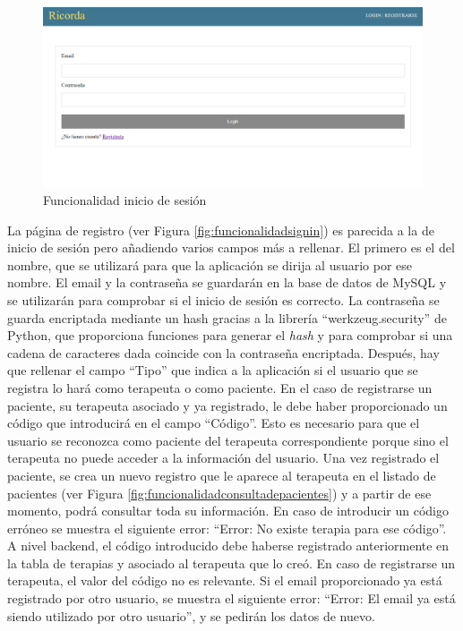 \begin{figure}[h]
	\centering
	\includegraphics[scale=0.5]{Imagenes/Vectorial/funcionalidad_login}
	\caption{Funcionalidad inicio de sesión}
	\label{fig:funcionalidadlogin}
\end{figure}

La página de registro (ver Figura \ref{fig:funcionalidadsignin}) es parecida a la de inicio de sesión pero añadiendo varios campos más a rellenar. El primero es el del nombre, que se utilizará para que la aplicación se dirija al usuario por ese nombre. El email y la contraseña se guardarán en la base de datos de MySQL y se utilizarán para comprobar si el inicio de sesión es correcto. La contraseña se guarda encriptada mediante un hash gracias a la librería ``werkzeug.security'' de Python, que proporciona funciones para generar el \textit{hash} y para comprobar si una cadena de caracteres dada coincide con la contraseña encriptada. Después, hay que rellenar el campo ``Tipo'' que indica a la aplicación si el usuario que se registra lo hará como terapeuta o como paciente. En el caso de registrarse un paciente, su terapeuta asociado y ya registrado, le debe haber proporcionado un código que introducirá en el campo ``Código''. Esto es necesario para que el usuario se reconozca como paciente del terapeuta correspondiente porque sino el terapeuta no puede acceder a la información del usuario. Una vez registrado el paciente, se crea un nuevo registro que le aparece al terapeuta en el listado de pacientes (ver Figura \ref{fig:funcionalidadconsultadepacientes}) y a partir de ese momento, podrá consultar toda su información. En caso de introducir un código erróneo se muestra el siguiente error: ``Error: No existe terapia para ese código''. A nivel backend, el código introducido debe haberse registrado anteriormente en la tabla de terapias y asociado al terapeuta que lo creó. En caso de registrarse un terapeuta, el valor del código no es relevante. Si el email proporcionado ya está registrado por otro usuario, se muestra el siguiente error: ``Error: El email ya está siendo utilizado por otro usuario'', y se pedirán los datos de nuevo.

